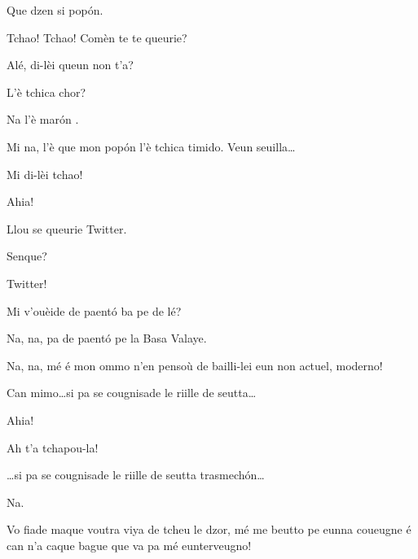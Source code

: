 \begin{drama}
\Tantaspeaks{} Que dzen si pop\'on.


\Tantaspeaks Tchao!  Tchao! Comèn te te queurie?


\Alicespeaks{} Alé, di-lèi queun non t'a?


\Tantaspeaks L'è tchica chor?

\Tanteunspeaks Na l'è mar\'on .

\Alicespeaks Mi na, l'è que mon pop\'on l'è tchica timido.  Veun seuilla\ldots


\Tanteunspeaks{} Mi di-lèi tchao!


\Twitterspeaks Ahia!

\Alicespeaks{} Llou se queurie Twitter.

\Tantaspeaks{} Senque? 

\Alicespeaks Twitter!

\Tantaspeaks Mi v'ouèide de paent\'o ba pe de lé?

\Tanteunspeaks Na, na, pa de paent\'o pe la Basa Valaye.

\Alicespeaks Na, na, mé é mon ommo n’en pensoù de bailli-lei eun non actuel, moderno!

\Tantaspeaks Can mimo\ldots si pa se cougnisade le riille de seutta\ldots


\Twitterspeaks{} Ahia!

\Tanteunspeaks{} Ah t'a tchapou-la!

\Tantaspeaks \ldots si pa se cougnisade le riille de seutta trasmech\'on\ldots

\Alicespeaks Na.

\Tantaspeaks Vo fiade maque voutra viya de tcheu le dzor, mé me beutto pe eunna coueugne é can n'a caque bague que va pa  mé eunterveugno!


\end{drama}
